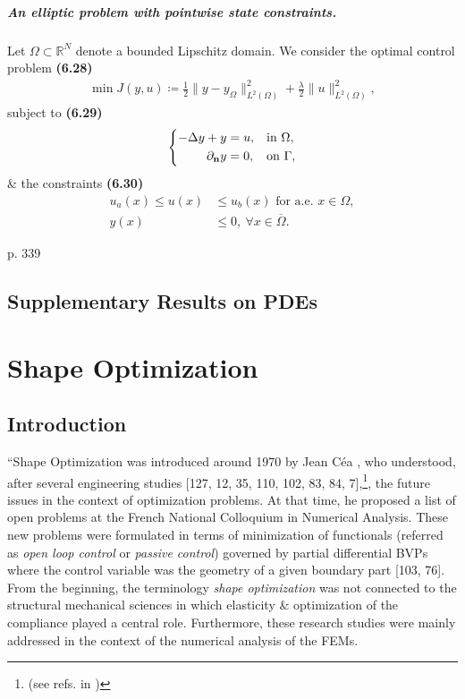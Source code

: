 \documentclass[oneside]{book}
\numberwithin{equation}{section}
\begin{document}
\paragraph{An elliptic problem with pointwise state constraints.} Let $\Omega\subset\mathbb{R}^N$ denote a bounded Lipschitz domain. We consider the optimal control problem \textbf{(6.28)}
\begin{align*}
	\min J(y,u)\coloneqq\frac{1}{2}\|y - y_\Omega\|_{L^2(\Omega)}^2 + \frac{\lambda}{2}\|u\|_{L^2(\Omega)}^2,
\end{align*}
subject to \textbf{(6.29)}
\begin{equation*}
	\left\{\begin{split}
		-\Delta y + y &= u,&&\mbox{in }\Omega,\\
		\partial_{\bf n}y &= 0,&&\mbox{on }\Gamma,
	\end{split}\right.
\end{equation*}
\& the constraints \textbf{(6.30)}
\begin{align*}
	u_a(x)\le u(x)&\le u_b(x)\mbox{ for a.e. } x\in\Omega,\\
	y(x)&\le 0,\ \forall x\in\overline{\Omega}.
\end{align*}

p. 339

\section{Supplementary Results on PDEs}


\chapter{Shape Optimization}

\section{Introduction}
``Shape Optimization was introduced around 1970 by Jean C\'ea \cite{Cea_Gioan_Michel1973}, who understood, after several engineering studies [127, 12, 35, 110, 102, 83, 84, 7],\footnote{(see refs. in \cite{Moubachir_Zolesio2006})}, the future issues in the context of optimization problems. At that time, he proposed a list of open problems at the French National Colloquium in Numerical Analysis. These new problems were formulated in terms of minimization of functionals (referred as \textit{open loop control} or \textit{passive control}) governed by partial differential BVPs where the control variable was the geometry of a given boundary part [103, 76]. From the beginning, the terminology \textit{shape optimization} was not connected to the structural mechanical sciences in which elasticity \& optimization of the compliance played a central role. Furthermore, these research studies were mainly addressed in the context of the numerical analysis of the FEMs.
\end{document}
